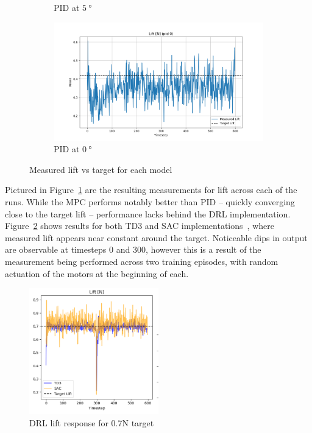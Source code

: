 \begin{figure}[h]
\begin{subfigure}[b]{0.49\textwidth}
        \caption{PID at $\SI{5}{\degree}$}
    \end{subfigure}
    \begin{subfigure}[b]{0.49\textwidth}
        \centering
        \includegraphics[width=\textwidth]{./img/LiftPID0.png}
        \caption{PID at $\SI{0}{\degree}$}
    \end{subfigure}
    \caption{Measured lift vs target for each model}
    \label{fig:measurement_lift}
\end{figure}

Pictured in Figure~\ref{fig:measurement_lift} are the resulting measurements for lift across each of the runs. While the MPC performs notably better than PID -- quickly converging close to the target lift -- performance lacks behind the DRL implementation. Figure~\ref{fig:measurement_lift-DRL} shows results for both TD3 and SAC implementations~\cite{5}, where measured lift appears near constant around the target. Noticeable dips in output are observable at timesteps 0 and 300, however this is a result of the measurement being performed across two training episodes, with random actuation of the motors at the beginning of each.
\\
\begin{figure}[h]
    \begin{center}
        \includegraphics[width=0.5\textwidth]{./img/LiftDRL}
    \end{center}
    \caption{DRL lift response for 0.7N target~\cite{5}}\label{fig:measurement_lift-DRL}
\end{figure}
\\

